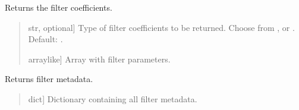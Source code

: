 \documentclass[letterpaper,10pt,english]{sphinxmanual}
\begin{document}
\begin{fulllineitems}
\begin{fulllineitems}
\begin{quote}
\begin{description}
\end{description}\end{quote}

\end{fulllineitems}


\begin{fulllineitems}
\label{\detokenize{classes:dsptools.classes.filter_class.Filter.get_coefficients}}
\pysigstartsignatures
{}
\pysigstopsignatures
\sphinxAtStartPar
Returns the filter coefficients.
\begin{quote}\begin{description}
\begin{description}
\sphinxlineitem{\sphinxstylestrong{mode}}{[}str, optional{]}
\sphinxAtStartPar
Type of filter coefficients to be returned. Choose from ,
 or . Default: .

\end{description}

\begin{description}
\sphinxlineitem{\sphinxstylestrong{coefficients}}{[}array\sphinxhyphen{}like{]}
\sphinxAtStartPar
Array with filter parameters.

\end{description}

\end{description}\end{quote}

\end{fulllineitems}


\begin{fulllineitems}
\label{\detokenize{classes:dsptools.classes.filter_class.Filter.get_filter_metadata}}
\pysigstartsignatures
{}
\pysigstopsignatures
\sphinxAtStartPar
Returns filter metadata.
\begin{quote}\begin{description}
\begin{description}
\sphinxlineitem{\sphinxstylestrong{info}}{[}dict{]}
\sphinxAtStartPar
Dictionary containing all filter metadata.


\end{description}
\end{description}
\end{quote}
\end{fulllineitems}
\end{fulllineitems}
\end{document}
